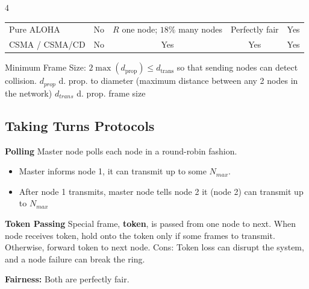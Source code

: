 \documentclass[10pt]{extarticle}
\begin{document}
\begin{multicols}{4}
\begin{center}
{\begin{tabular}{lcccc}
    Pure ALOHA
    & No
    & \(R\) one node; \(18\%\) many nodes
    & Perfectly fair
    & Yes \\

    CSMA / CSMA/CD
    & No
    & Yes
    & Yes
    & Yes \\
    \hline
  \end{tabular}%
}
\end{center}

Minimum Frame Size: $2\max\left(d_{\mathrm{prop}}\right) \leq d_{\mathrm{trans}}$ so that sending nodes can detect collision.
$d_{prop}$ d. prop. to diameter (maximum distance between any 2 nodes in the network)
$d_{trans}$ d. prop. frame size

\subsection{Taking Turns Protocols}
\textbf{Polling}
Master node polls each node in a round-robin fashion.
\begin{itemize}
\item Master informs node 1, it can transmit up to some $N_{max}$.
\item After node 1 transmits, master node tells node 2 it (node 2) can transmit up to $N_{max}$
\end{itemize}

\textbf{Token Passing}
Special frame, \textbf{token}, is passed from one node to
next. When node receives token, hold onto the token only if some frames to transmit. Otherwise, forward token
to next node. Cons: Token loss can disrupt the system, and a node failure can break the ring.

\begin{center}

\vspace{2mm}
\textbf{Fairness:} Both are perfectly fair.
\end{center}


\end{multicols}
\end{document}
